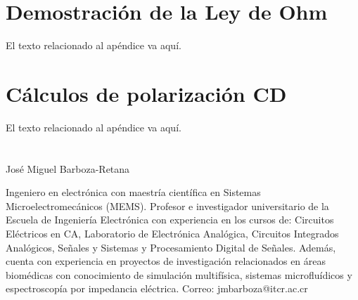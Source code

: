 \documentclass[journal]{IEEEtran}
\begin{document}
\appendices
\section{Demostración de la Ley de Ohm}
El texto relacionado al apéndice va aquí.

\section{Cálculos de polarización CD}
El texto relacionado al apéndice va aquí.



\section{}
\printbibliography


\begin{IEEEbiography}{José Miguel Barboza-Retana}

Ingeniero en electrónica con maestría científica en Sistemas Microelectromecánicos (MEMS). Profesor e investigador universitario de la Escuela de Ingeniería Electrónica con experiencia en los cursos de: Circuitos Eléctricos en CA, Laboratorio de Electrónica Analógica, Circuitos Integrados Analógicos, Señales y Sistemas y Procesamiento Digital de Señales. Además, cuenta con experiencia en proyectos de investigación relacionados en áreas biomédicas con conocimiento de simulación multifísica, sistemas microfluídicos y espectroscopía por impedancia eléctrica.
Correo: jmbarboza@itcr.ac.cr

\end{IEEEbiography}
 
\end{document}
